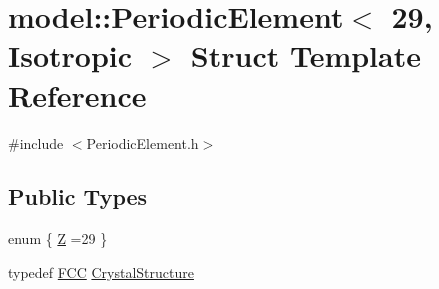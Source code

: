 \hypertarget{structmodel_1_1_periodic_element_3_0129_00_01_isotropic_01_4}{}\section{model\+:\+:Periodic\+Element$<$ 29, Isotropic $>$ Struct Template Reference}
\label{structmodel_1_1_periodic_element_3_0129_00_01_isotropic_01_4}


{\ttfamily \#include $<$Periodic\+Element.\+h$>$}

\subsection*{Public Types}
\begin{DoxyCompactItemize}
\item 
enum \{ \hyperlink{structmodel_1_1_periodic_element_3_0129_00_01_isotropic_01_4_a7e55d3986aadabe6e222b0f2ee82dd28a6f9f6967dea6ff534719c7c0a8e944f7}{Z} =29
 \}
\item 
typedef \hyperlink{structmodel_1_1_f_c_c}{F\+C\+C} \hyperlink{structmodel_1_1_periodic_element_3_0129_00_01_isotropic_01_4_a938a6702975c58e5d6c07f05ba239913}{Crystal\+Structure}
\end{DoxyCompactItemize}
